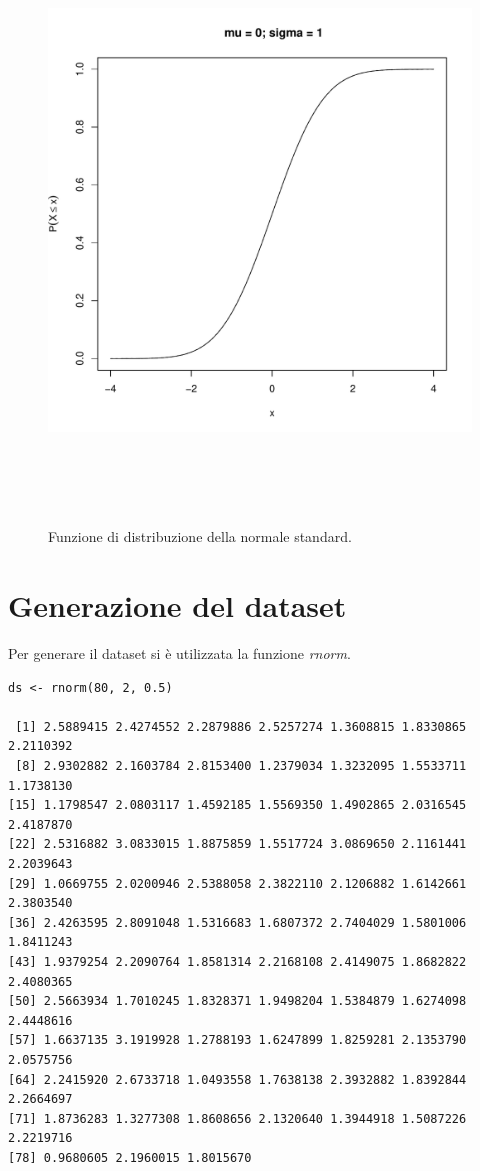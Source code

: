 \begin{figure}[!htb]
    \centering
    \includegraphics[height=16cm]{capitoli/images/1_introduzione/dist_var_norm_stand.pdf}
    \caption{Funzione di distribuzione della normale standard.}
\end{figure}


\section{Generazione del dataset}

Per generare il dataset si è utilizzata la funzione \textit{rnorm}.

\vspace{5mm}
\begin{lstlisting}
ds <- rnorm(80, 2, 0.5)

 [1] 2.5889415 2.4274552 2.2879886 2.5257274 1.3608815 1.8330865 2.2110392
 [8] 2.9302882 2.1603784 2.8153400 1.2379034 1.3232095 1.5533711 1.1738130
[15] 1.1798547 2.0803117 1.4592185 1.5569350 1.4902865 2.0316545 2.4187870
[22] 2.5316882 3.0833015 1.8875859 1.5517724 3.0869650 2.1161441 2.2039643
[29] 1.0669755 2.0200946 2.5388058 2.3822110 2.1206882 1.6142661 2.3803540
[36] 2.4263595 2.8091048 1.5316683 1.6807372 2.7404029 1.5801006 1.8411243
[43] 1.9379254 2.2090764 1.8581314 2.2168108 2.4149075 1.8682822 2.4080365
[50] 2.5663934 1.7010245 1.8328371 1.9498204 1.5384879 1.6274098 2.4448616
[57] 1.6637135 3.1919928 1.2788193 1.6247899 1.8259281 2.1353790 2.0575756
[64] 2.2415920 2.6733718 1.0493558 1.7638138 2.3932882 1.8392844 2.2664697
[71] 1.8736283 1.3277308 1.8608656 2.1320640 1.3944918 1.5087226 2.2219716
[78] 0.9680605 2.1960015 1.8015670
\end{lstlisting}
\vspace{5mm}

